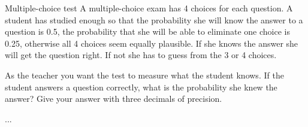 \documentclass[a4paper,10pt]{article}
\begin{document}
\begin{nproblem}{3}{Multiple-choice test}
A multiple-choice exam has 4 choices for each question. A student has studied enough so that the probability she will know the answer to a question is 0.5, the probability that she will be able to eliminate one choice is 0.25, otherwise all 4 choices seem equally plausible. If she knows the answer she will get the question right. If not she has to guess from the 3 or 4 choices.
 
As the teacher you want the test to measure what the student knows. If the student answers a question correctly, what is the probability she knew the answer? Give your answer with three decimals of precision.
\begin{solution}
...
\end{solution}
\end{nproblem}













\newcommand{\lang}{\textit{lang}}
\newcommand{\coll}{\textit{coll}}
\end{document}
